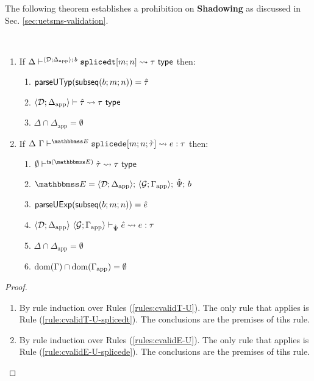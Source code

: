 The following theorem establishes a prohibition on \textbf{Shadowing} as discussed in Sec. \ref{sec:uetsms-validation}.
\begingroup
\def\thetheorem{\ref{thm:shadowing-prohibition-SES}}
\begin{theorem} ~
\begin{enumerate}
\item If $\Delta\vdash^{\langle \mathcal{D}; \Delta_\text{app} \rangle;\,b} \texttt{splicedt}[m; n] \leadsto \tau~\mathsf{type}$ then:\begin{enumerate}
\item $\mathsf{parseUTyp}(\mathsf{subseq}(b; m; n))={\hat\tau}$
\item $\langle \mathcal{D}; \Delta_\text{app} \rangle \vdash {\hat\tau} \leadsto \tau~\mathsf{type}$
\item $\Delta \cap \Delta_\text{app} = \emptyset$
\end{enumerate}
\item If $\cvalidE{\Delta}{\Gamma}{\escenev}{\acesplicede{m}{n}{\ctau}}{e}{\tau}$ then:
\begin{enumerate}
\item $\cvalidT{\emptyset}{\tsfrom{\escenev}}{\ctau}{\tau}$
\item $  \escenev=\esceneU{\uDD{\uD}{\Delta_\text{app}}}{\uGG{\uG}{\Gamma_\text{app}}}{\uPsi}{b}$
\item $\mathsf{parseUExp}(\mathsf{subseq}(b; m; n))={\hat e}$
\item $\langle \mathcal{D}; \Delta_\text{app} \rangle~\langle \mathcal{G}; \Gamma_\text{app} \rangle \vdash_{\hat{\Psi}} {\hat e} \leadsto e : \tau$
\item $\Delta \cap \Delta_\text{app} = \emptyset$
\item $\text{dom}(\Gamma) \cap \text{dom}(\Gamma_\text{app}) = \emptyset$
\end{enumerate}
\end{enumerate}
\end{theorem}
\begin{proof} ~
\begin{enumerate}
\item By rule induction over Rules (\ref{rules:cvalidT-U}). The only rule that applies is Rule (\ref{rule:cvalidT-U-splicedt}). The conclusions are the premises of tihs rule.
\item By rule induction over Rules (\ref{rules:cvalidE-U}). The only rule that applies is Rule (\ref{rule:cvalidE-U-splicede}). The conclusions are the premises of tihs rule.
\end{enumerate}
\end{proof}
\endgroup
